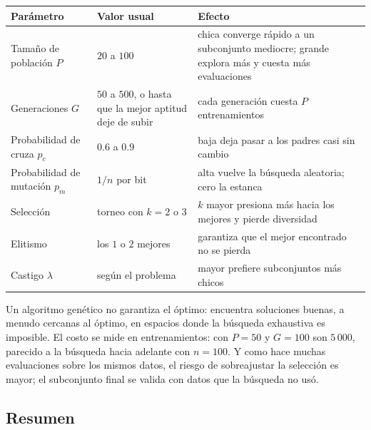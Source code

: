 \documentclass[11pt,letterpaper]{article}
\begin{document}
\begin{center}
\small
\begin{tabular}{>{\raggedright\arraybackslash}p{2.6cm}%
                >{\raggedright\arraybackslash}p{2.4cm}%
                >{\raggedright\arraybackslash}p{8.4cm}}
    \toprule
    \textbf{Parámetro} & \textbf{Valor usual} & \textbf{Efecto} \\
    \midrule
    Tamaño de población $P$ & $20$ a $100$
        & chica converge rápido a un subconjunto mediocre; grande
          explora más y cuesta más evaluaciones \\
    \addlinespace
    Generaciones $G$ & $50$ a $500$, o hasta que la mejor aptitud deje
        de subir
        & cada generación cuesta $P$ entrenamientos \\
    \addlinespace
    Probabilidad de cruza $p_c$ & $0.6$ a $0.9$
        & baja deja pasar a los padres casi sin cambio \\
    \addlinespace
    Probabilidad de mutación $p_m$ & $1/n$ por bit
        & alta vuelve la búsqueda aleatoria; cero la estanca \\
    \addlinespace
    Selección & torneo con $k = 2$ o $3$
        & $k$ mayor presiona más hacia los mejores y pierde
          diversidad \\
    \addlinespace
    Elitismo & los $1$ o $2$ mejores
        & garantiza que el mejor encontrado no se pierda \\
    \addlinespace
    Castigo $\lambda$ & según el problema
        & mayor prefiere subconjuntos más chicos \\
    \bottomrule
\end{tabular}
\end{center}

\begin{ojo}
    Un algoritmo genético no garantiza el óptimo: encuentra soluciones
    buenas, a menudo cercanas al óptimo, en espacios donde la búsqueda
    exhaustiva es imposible. El costo se mide en entrenamientos: con
    $P = 50$ y $G = 100$ son $5\,000$, parecido a la búsqueda hacia
    adelante con $n = 100$. Y como hace muchas evaluaciones sobre los
    mismos datos, el riesgo de sobreajustar la selección es mayor; el
    subconjunto final se valida con datos que la búsqueda no usó.
\end{ojo}


\subsection*{Resumen}
\end{document}
